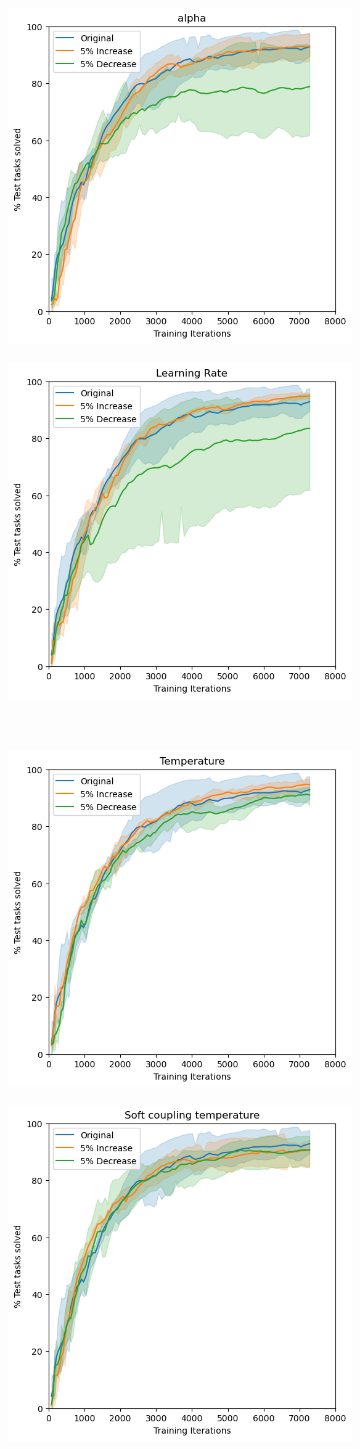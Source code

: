 \documentclass{usiinftr}
\begin{document}
\begin{figure}[h]
    \centering
    \begin{subfigure}
        \centering
        \includegraphics[width = 0.35\linewidth]{figures/alpha.png}
        \label{}
    \end{subfigure}%
    \begin{subfigure}
        \centering
        \includegraphics[width = 0.35\linewidth]{figures/learning_rate.png}
        \label{}
    \end{subfigure}\\
    \begin{subfigure}
        \centering
        \includegraphics[width = 0.35\linewidth]{figures/temperature.png}
        \label{}
    \end{subfigure}%
    \begin{subfigure}
        \centering
        \includegraphics[width = 0.35\linewidth]{figures/soft_coupling_temperature.png}
        \label{}
    \end{subfigure}
    \caption{}
    \label{fig:HyperParameterTuning}
\end{figure}
\end{document}
